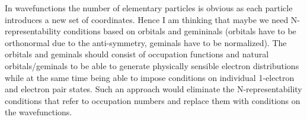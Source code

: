 \documentclass{article}
\begin{document}
In wavefunctions the number of elementary particles is obvious as each particle
introduces a new set of coordinates. Hence I am thinking that maybe we need
N-representability conditions based on orbitals and gemininals (orbitals have
to be orthonormal due to the anti-symmetry, geminals have to be normalized). 
The orbitals and geminals should consist of occupation functions and natural
orbitals/geminals to be able to generate physically sensible electron
distributions while at the same time being able to impose conditions on 
individual 1-electron and electron pair states. Such an approach would
eliminate the N-representability conditions that refer to occupation numbers
and replace them with conditions on the wavefunctions.



\end{document}
